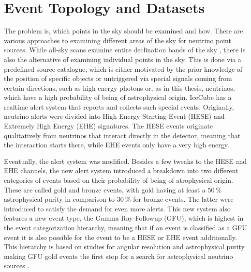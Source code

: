 \chapter{Event Topology and Datasets} \label{sec:events_data}

%
The problem is, which points in the sky should be examined and how.
There are various approaches to examining different areas of the sky for neutrino point sources.
While all-sky scans examine entire declination bands of the sky \cite{all_sky_paper}, there is also the alternative of examining individual points in the sky.
This is done via a predefined source catalogue, which is either motivated by the prior knowledge of the position of specific objects or untriggered via special signals coming from certain directions, such as high-energy photons or, as in this thesis, neutrinos, which have a high probability of being of astrophysical origin.
IceCube has a realtime alert system that reports and collects such special events.
Originally, neutrino alerts were divided into High Energy Starting Event (HESE) and Extremely High Energy (EHE) signatures.
The HESE events originate qualitatively from neutrinos that interact directly in the detector, meaning that the interaction starts there, while EHE events only have a very high energy.

Eventually, the alert system was modified.
Besides a few tweaks to the HESE and EHE channels, the new alert system introduced a breakdown into two different categories of events based on their probability of being of atrophysical origin.
These are called gold and bronze events, with gold having at least a $\SI{50}{\percent}$ astrophysical purity in comparison to $\SI{30}{\percent}$ for bronze events.
The latter were introduced to satisfy the demand for even more alerts.
This new system also features a new event type, the Gamma-Ray-Followup (GFU), which is highest in the event categorization hierarchy, meaning that if an event is classified as a GFU event it is also possible for the event to be a HESE or EHE event additionally.
This hierarchy is based on studies for angular resolution and astrophysical purity making GFU gold events the first stop for a search for astrophysical neutrino sources \cite{Aartsen_2017}.

